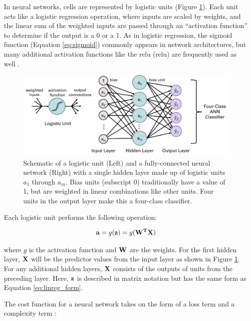 In neural networks, cells are represented by logistic units (Figure \ref{fig:nn_schematic}). Each unit acts like a logistic regression operation, where inputs are scaled by weights, and the linear sum of the weighted inputs are passed through an “activation function” to determine if the output is a 0 or a 1. As in logistic regression, the sigmoid function (Equation \ref{eq:sigmoid}) commonly appears in network architectures, but many additional activation functions like the \acrlong{relu} (\acrshort{relu}) are frequently used as well \citep{brownlee_gentle_2019}.

\begin{figure}[!htp]
\centering
\includegraphics[width=\textwidth]{templates/images/Figure-ANN.png}
\caption[Neural network schematic]{Schematic of a logistic unit (Left) and a fully-connected neural network (Right) with a single hidden layer made up of logistic units $a_1$ through $a_m$. Bias units (subscript 0) traditionally have a value of 1, but are weighted in linear combinations like other units. Four units in the output layer make this a four-class classifier.}
\label{fig:nn_schematic}
\end{figure}

Each logistic unit performs the following operation:

\begin{equation}
\label{eq:nn_activation}
    {\bf{a}} = g({\bf{z}}) = g({\bf{W^TX}})
\end{equation}

where $g$ is the activation function and $\bf{W}$ are the weights. For the first hidden layer, $\bf{X}$ will be the predictor values from the input layer as shown in Figure \ref{fig:nn_schematic}. For any additional hidden layers, $\bf{X}$ consists of the outputs of units from the preceding layer. Here, $\bf{z}$ is described in matrix notation but has the same form as Equation \ref{eq:linreg_form}. 

The cost function for a neural network takes on the form of a loss term and a complexity term \citep{ng_neural_2011}:

